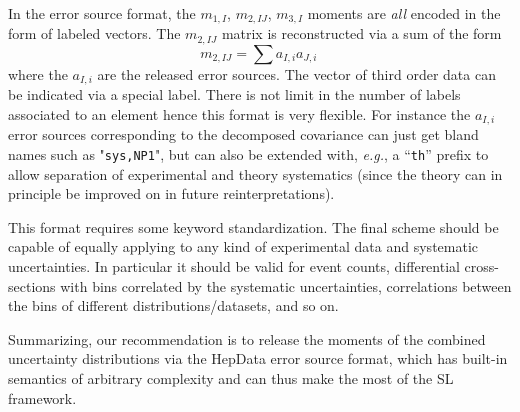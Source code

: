\documentclass[11pt]{article}
\def\eg{{\it e.g.}}
\newcommand{\be}{\begin{equation}}
\newcommand{\ee}{\end{equation}}
\begin{document}
In the error source format, the $m_{1,I}$, $m_{2,IJ}$, $m_{3,I}$ moments are
\textit{all} encoded in the form of labeled vectors. The $m_{2,IJ}$ matrix is
reconstructed via a sum of the form \be m_{2,IJ}= \sum {a_{I,i}a_{J,i}} \, 
\label{eq:sum_errsource}
\ee
where the $a_{I,i}$ are the released error sources.
The vector of third order data can be  indicated via a special label.
There is not limit in the number of labels associated to an element hence this format is very flexible.
For instance the $a_{I,i}$ error sources corresponding to the decomposed covariance  can just get bland names such as "{\tt sys,NP1}", but  can also be extended with, \eg, a ``{\tt th}'' prefix to allow separation of experimental and theory systematics (since the theory can in principle be improved on in future reinterpretations).


This format requires some keyword standardization.  The final scheme should
be capable of equally applying to any kind of experimental data and systematic uncertainties. In particular it should be valid for event counts,  differential cross-sections with bins correlated by the systematic uncertainties, correlations between  the bins of different distributions/datasets, and so on.




Summarizing, our recommendation is to release the moments of the combined uncertainty distributions via the HepData error source format, which has built-in semantics of arbitrary complexity and can thus  make the most of the SL framework.




\end{document}
